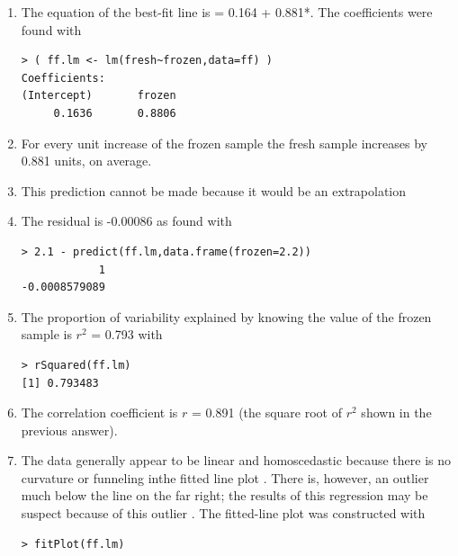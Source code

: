 \documentclass[10pt,openany]{book}\usepackage[]{graphicx}\usepackage[]{color}
\makeatletter
\newenvironment{kframe}{%
 \def\at@end@of@kframe{}%
 \ifinner\ifhmode%
  \def\at@end@of@kframe{\end{minipage}}%
  \begin{minipage}{\columnwidth}%
 \fi\fi%
 \def\FrameCommand##1{\hskip\@totalleftmargin \hskip-\fboxsep
 \colorbox{shadecolor}{##1}\hskip-\fboxsep
     \hskip-\linewidth \hskip-\@totalleftmargin \hskip\columnwidth}%
 \MakeFramed {\advance\hsize-\width
   \@totalleftmargin\z@ \linewidth\hsize
   \@setminipage}}%
 {\par\unskip\endMakeFramed%
 \at@end@of@kframe}
\newenvironment{knitrout}{}{} %
\makeatother
\begin{document}
\begin{itemize}
\begin{enumerate}
      \item The equation of the best-fit line is  = 0.164 + 0.881*.  The coefficients were found with
\begin{knitrout}
\color{fgcolor}\begin{kframe}
\begin{verbatim}
> ( ff.lm <- lm(fresh~frozen,data=ff) )
Coefficients:
(Intercept)       frozen  
     0.1636       0.8806  
\end{verbatim}
\end{kframe}
\end{knitrout}
      \item For every unit increase of the frozen sample the fresh sample increases by 0.881 units, on average.
      \item This prediction cannot be made because it would be an extrapolation
      \item The residual is -0.00086 as found with
\begin{knitrout}
\color{fgcolor}\begin{kframe}
\begin{verbatim}
> 2.1 - predict(ff.lm,data.frame(frozen=2.2))
            1 
-0.0008579089 
\end{verbatim}
\end{kframe}
\end{knitrout}
      \item The proportion of variability explained by knowing the value of the frozen sample is $r^{2}$ = 0.793 with
\begin{knitrout}
\color{fgcolor}\begin{kframe}
\begin{verbatim}
> rSquared(ff.lm)
[1] 0.793483
\end{verbatim}
\end{kframe}
\end{knitrout}
      \item The correlation coefficient is $r$ = 0.891 (the square root of $r^{2}$ shown in the previous answer).
      \item The data generally appear to be linear and homoscedastic because there is no curvature or funneling inthe fitted line plot .  There is, however, an outlier much below the line on the far right; the results of this regression may be suspect because of this outlier .  The fitted-line plot was constructed with
\begin{knitrout}
\color{fgcolor}\begin{kframe}
\begin{verbatim}
> fitPlot(ff.lm)
\end{verbatim}
\end{kframe}\begin{figure}[hbtp]


\end{figure}
\end{knitrout}
\end{enumerate}
\end{itemize}
\end{document}
